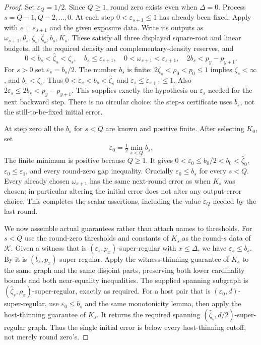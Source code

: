 \begin{proof}
Set $\varepsilon_Q=1/2$. Since $Q\geq1$, round zero exists even when
$\Delta=0$. Process $s=Q-1,Q-2,\ldots,0$.
At each step $0<\varepsilon_{s+1}\leq1$ has already been fixed.
Apply  with $e=\varepsilon_{s+1}$
and the given exposure data. Write its outputs as
$\omega_{s+1},\theta_s,\zeta_s,\widehat\zeta_s,b_s,K_s$.
These satisfy all three displayed square-root and linear budgets, all
the required density and complementary-density reserves, and
\[
 0<b_s<\widehat\zeta_s<\zeta_s,\quad
 b_s\leq\varepsilon_{s+1},\quad
 0<\omega_{s+1}<\varepsilon_{s+1},\quad
 2b_s<p_y-p_{y+1}.
\]
For $s>0$ set $\varepsilon_s=b_s/2$. The number $b_s$ is finite:
$2\zeta_s<\rho_0<p_0\leq1$ implies
$\zeta_s<\infty$, and $b_s<\zeta_s$.
Thus $0<\varepsilon_s<b_s<\widehat\zeta_s$ and
$\varepsilon_s\leq\varepsilon_{s+1}\leq1$.
Also $2\varepsilon_s\leq2b_s<p_y-p_{y+1}$.
This supplies exactly the hypothesis on $\varepsilon_s$ needed for
the next backward step. There is no circular choice: the step-$s$
certificate uses $b_s$, not the still-to-be-fixed initial error.

At step zero all the $b_s$ for $s<Q$ are known and positive finite.
After selecting $K_0$, set
\[
 \varepsilon_0=\tfrac12\min_{s<Q} b_s.
\]
The finite minimum is positive because $Q\geq1$. It gives
$0<\varepsilon_0\leq b_0/2<b_0<\widehat\zeta_0$,
$\varepsilon_0\leq\varepsilon_1$, and every round-zero gap inequality.
Crucially $\varepsilon_0\leq b_s$ for every $s<Q$.
Every already chosen $\omega_{s+1}$ has the same next-round error as
when $K_s$ was chosen; in particular altering the initial error does
not alter any output-error choice. This completes the scalar assertions,
including the value $\varepsilon_Q$ needed by the last round.

We now assemble actual guarantees rather than attach names to thresholds.
For $s<Q$ use the round-zero thresholds and constants of $K_s$ as
the round-$s$ data of $\mathcal K$.
Given a witness that is $(\varepsilon_s,p_x)$-super-regular with
$x\leq\Delta$, we have $\varepsilon_s\leq b_s$.
By  it is $(b_s,p_x)$-super-regular.
Apply the witness-thinning guarantee of $K_s$ to the same graph and
the same disjoint parts, preserving both lower cardinality bounds and
both near-equality inequalities. The supplied spanning subgraph is
$(\widehat\zeta_s,\rho_x)$-super-regular, exactly as required.
For a host pair that is $(\varepsilon_0,d)$-super-regular, use
$\varepsilon_0\leq b_s$ and the same monotonicity lemma, then apply
the host-thinning guarantee of $K_s$. It returns the required spanning
$(\widehat\zeta_s,d/2)$-super-regular graph. Thus the single initial
error is below every host-thinning cutoff, not merely round zero's.


\end{proof}
